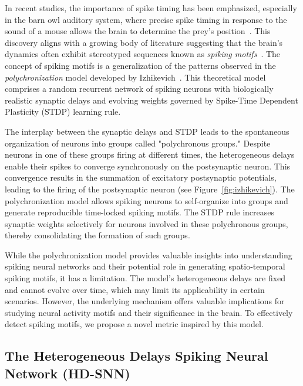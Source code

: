 \documentclass[runningheads]{llncs}
\begin{document}
%
In recent studies, the importance of spike timing has been emphasized, especially in the barn owl auditory system, where precise spike timing in response to the sound of a mouse allows the brain to determine the prey's position~\cite{goodman_spike-timing-based_2010}. This discovery aligns with a growing body of literature suggesting that the brain's dynamics often exhibit stereotyped sequences known as \emph{spiking motifs}~\cite{grimaldi_precise_2023}. The concept of spiking motifs is a generalization of the patterns observed in the \textit{polychronization} model developed by Izhikevich~\cite{izhikevich_polychronization_2006}. This theoretical model comprises a random recurrent network of spiking neurons with biologically realistic synaptic delays and evolving weights governed by Spike-Time Dependent Plasticity (STDP) learning rule.

The interplay between the synaptic delays and STDP leads to the spontaneous organization of neurons into groups called "polychronous groups." Despite neurons in one of these groups firing at different times, the heterogeneous delays enable their spikes to converge synchronously on the postsynaptic neuron. This convergence results in the summation of excitatory postsynaptic potentials, leading to the firing of the postsynaptic neuron (see Figure~\ref{fig:izhikevich}). The polychronization model allows spiking neurons to self-organize into groups and generate reproducible time-locked spiking motifs. The STDP rule increases synaptic weights selectively for neurons involved in these polychronous groups, thereby consolidating the formation of such groups.

While the polychronization model provides valuable insights into understanding spiking neural networks and their potential role in generating spatio-temporal spiking motifs, it has a limitation. The model's heterogeneous delays are fixed and cannot evolve over time, which may limit its applicability in certain scenarios. However, the underlying mechanism offers valuable implications for studying neural activity motifs and their significance in the brain. To effectively detect spiking motifs, we propose a novel metric inspired by this model.
\subsection{The Heterogeneous Delays Spiking Neural Network (HD-SNN)}
\end{document}
